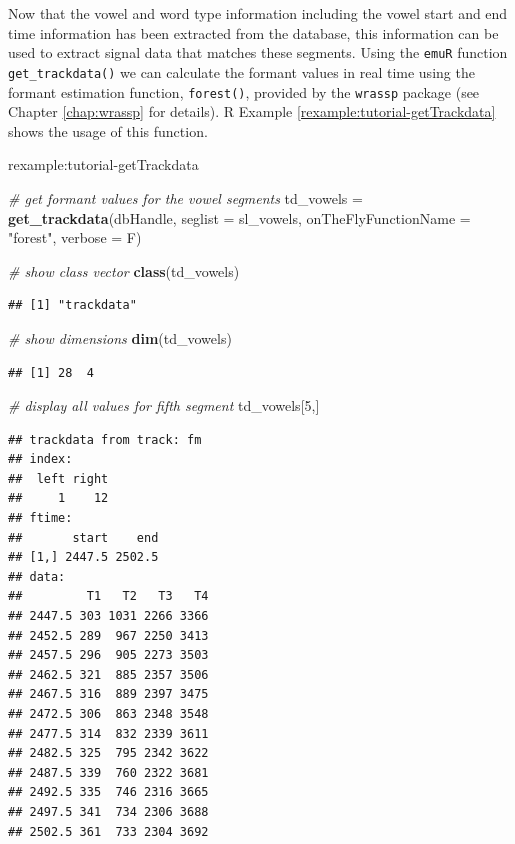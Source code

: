 \documentclass[]{book}
\newenvironment{Shaded}{\begin{snugshade}}{\end{snugshade}}
\newcommand{\CommentTok}[1]{\textcolor[rgb]{0.56,0.35,0.01}{\textit{#1}}}
\newcommand{\DataTypeTok}[1]{\textcolor[rgb]{0.13,0.29,0.53}{#1}}
\newcommand{\DecValTok}[1]{\textcolor[rgb]{0.00,0.00,0.81}{#1}}
\newcommand{\KeywordTok}[1]{\textcolor[rgb]{0.13,0.29,0.53}{\textbf{#1}}}
\newcommand{\NormalTok}[1]{#1}
\newcommand{\StringTok}[1]{\textcolor[rgb]{0.31,0.60,0.02}{#1}}
\theoremstyle{definition}
\theoremstyle{definition}
\theoremstyle{definition}
\theoremstyle{remark}
\begin{document}
Now that the vowel and word type information including the vowel start
and end time information has been extracted from the database, this
information can be used to extract signal data that matches these
segments. Using the \texttt{emuR} function \texttt{get\_trackdata()} we
can calculate the formant values in real time using the formant
estimation function, \texttt{forest()}, provided by the \texttt{wrassp}
package (see Chapter \ref{chap:wrassp} for details). R Example
\ref{rexample:tutorial-getTrackdata} shows the usage of this function.

rexample:tutorial-getTrackdata

\begin{Shaded}
\begin{Highlighting}[]
\CommentTok{# get formant values for the vowel segments}
\NormalTok{td_vowels =}\StringTok{ }\KeywordTok{get_trackdata}\NormalTok{(dbHandle,}
                          \DataTypeTok{seglist =}\NormalTok{ sl_vowels,}
                          \DataTypeTok{onTheFlyFunctionName =} \StringTok{"forest"}\NormalTok{,}
                          \DataTypeTok{verbose =}\NormalTok{ F)}

\CommentTok{# show class vector}
\KeywordTok{class}\NormalTok{(td_vowels)}
\end{Highlighting}
\end{Shaded}

\begin{verbatim}
## [1] "trackdata"
\end{verbatim}

\begin{Shaded}
\begin{Highlighting}[]
\CommentTok{# show dimensions}
\KeywordTok{dim}\NormalTok{(td_vowels)}
\end{Highlighting}
\end{Shaded}

\begin{verbatim}
## [1] 28  4
\end{verbatim}

\begin{Shaded}
\begin{Highlighting}[]
\CommentTok{# display all values for fifth segment}
\NormalTok{td_vowels[}\DecValTok{5}\NormalTok{,]}
\end{Highlighting}
\end{Shaded}

\begin{verbatim}
## trackdata from track: fm 
## index:
##  left right
##     1    12
## ftime:
##       start    end
## [1,] 2447.5 2502.5
## data:
##         T1   T2   T3   T4
## 2447.5 303 1031 2266 3366
## 2452.5 289  967 2250 3413
## 2457.5 296  905 2273 3503
## 2462.5 321  885 2357 3506
## 2467.5 316  889 2397 3475
## 2472.5 306  863 2348 3548
## 2477.5 314  832 2339 3611
## 2482.5 325  795 2342 3622
## 2487.5 339  760 2322 3681
## 2492.5 335  746 2316 3665
## 2497.5 341  734 2306 3688
## 2502.5 361  733 2304 3692
\end{verbatim}
\end{document}
